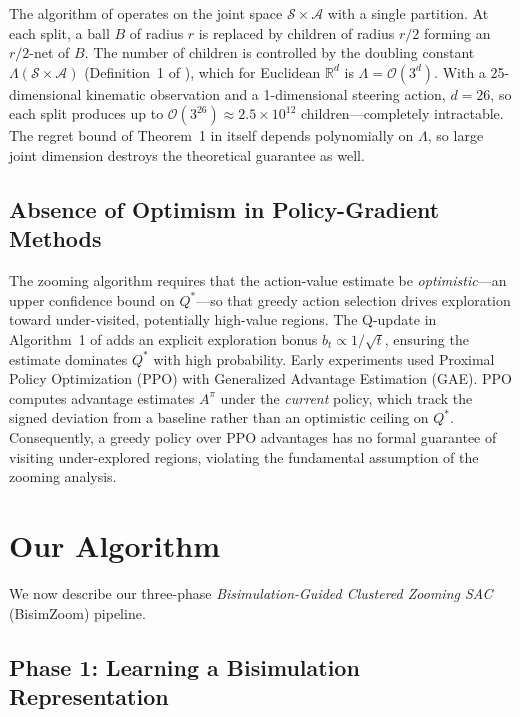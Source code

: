 \documentclass{article}
\begin{document}
The algorithm of \citet{cao2021} operates on the joint space $\mathcal{S} \times
\mathcal{A}$ with a single partition. At each split, a ball $B$ of radius $r$ is
replaced by children of radius $r/2$ forming an $r/2$-net of $B$. The number of
children is controlled by the doubling constant $\Lambda(\mathcal{S}\times\mathcal{A})$
(Definition~1 of \citet{cao2021}), which for Euclidean $\mathbb{R}^d$ is
$\Lambda = \mathcal{O}(3^d)$. With a 25-dimensional kinematic observation and a
1-dimensional steering action, $d = 26$, so each split produces up to
$\mathcal{O}(3^{26}) \approx 2.5\times10^{12}$ children---completely intractable. The
regret bound of Theorem~1 in \citet{cao2021} itself depends polynomially on $\Lambda$,
so large joint dimension destroys the theoretical guarantee as well.

\subsection{Absence of Optimism in Policy-Gradient Methods}

The zooming algorithm requires that the action-value estimate be
\emph{optimistic}---an upper confidence bound on $Q^*$---so that greedy action
selection drives exploration toward under-visited, potentially high-value regions.
The Q-update in Algorithm~1 of \citet{cao2021} adds an explicit exploration bonus
$b_t \propto 1/\sqrt{t}$, ensuring the estimate dominates $Q^*$ with high probability.
Early experiments used Proximal Policy Optimization (PPO) with Generalized Advantage
Estimation (GAE). PPO computes advantage estimates $A^\pi$ under the \emph{current}
policy, which track the signed deviation from a baseline rather than an optimistic
ceiling on $Q^*$. Consequently, a greedy policy over PPO advantages has no formal
guarantee of visiting under-explored regions, violating the fundamental assumption
of the zooming analysis.

\section{Our Algorithm}

We now describe our three-phase \emph{Bisimulation-Guided Clustered Zooming SAC}
(BisimZoom) pipeline.

\subsection{Phase 1: Learning a Bisimulation Representation}
\end{document}
